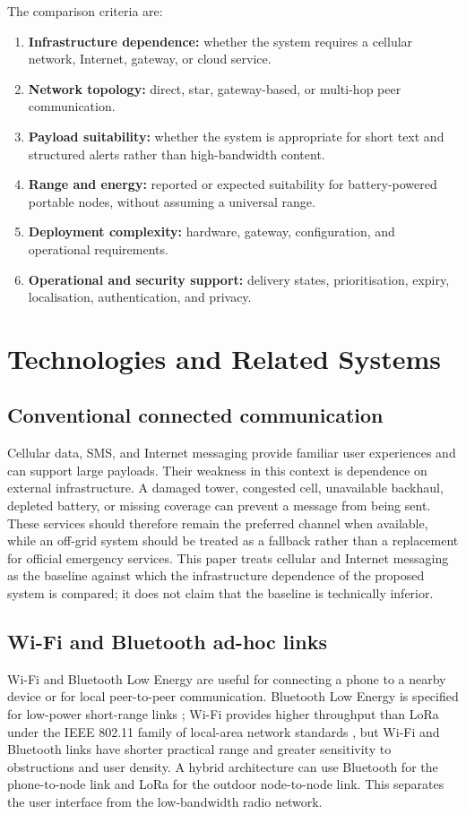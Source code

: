 \documentclass[journal]{IEEEtran}
\begin{document}
The comparison criteria are:
\begin{enumerate}
  \item \textbf{Infrastructure dependence:} whether the system requires a
  cellular network, Internet, gateway, or cloud service.
  \item \textbf{Network topology:} direct, star, gateway-based, or multi-hop
  peer communication.
  \item \textbf{Payload suitability:} whether the system is appropriate for
  short text and structured alerts rather than high-bandwidth content.
  \item \textbf{Range and energy:} reported or expected suitability for
  battery-powered portable nodes, without assuming a universal range.
  \item \textbf{Deployment complexity:} hardware, gateway, configuration, and
  operational requirements.
  \item \textbf{Operational and security support:} delivery states,
  prioritisation, expiry, localisation, authentication, and privacy.
\end{enumerate}

\section{Technologies and Related Systems}
\subsection{Conventional connected communication}
Cellular data, SMS, and Internet messaging provide familiar user experiences
and can support large payloads. Their weakness in this context is dependence on
external infrastructure. A damaged tower, congested cell, unavailable
backhaul, depleted battery, or missing coverage can prevent a message from
being sent. These services should therefore remain the preferred channel when
available, while an off-grid system should be treated as a fallback rather
than a replacement for official emergency services. This paper treats
cellular and Internet messaging as the baseline against which the
infrastructure dependence of the proposed system is compared; it does not
claim that the baseline is technically inferior.

\subsection{Wi-Fi and Bluetooth ad-hoc links}
Wi-Fi and Bluetooth Low Energy are useful for connecting a phone to a nearby
device or for local peer-to-peer communication. Bluetooth Low Energy is
specified for low-power short-range links \cite{bluetoothcore}; Wi-Fi provides
higher throughput than LoRa under the IEEE 802.11 family of local-area
network standards \cite{ieee802}, but Wi-Fi and Bluetooth links have shorter
practical range and greater sensitivity to obstructions and user density. A
hybrid architecture can use Bluetooth for
the phone-to-node link and LoRa for the outdoor node-to-node link. This
separates the user interface from the low-bandwidth radio network.
\end{document}
